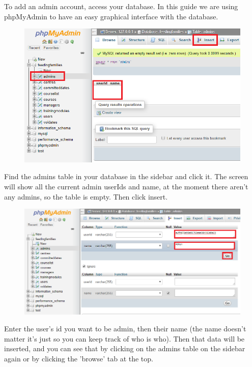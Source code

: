 \documentclass[12pt]{article}
\begin{document}
\noindent
To add an admin account, access your database. In this guide we are using phpMyAdmin to have an easy graphical interface with the database. 
\begin{figure}[H]
    \centering
    \includegraphics[width=1\textwidth]{admins/table.png}
\end{figure}
\noindent
Find the admins table in your database in the sidebar and click it. The screen will show all the current admin userIds and name, at the moment there aren't any admins, so the table is empty. Then click insert.
\begin{figure}[H]
    \centering
    \includegraphics[width=1\textwidth]{admins/insert.png}
\end{figure}
\noindent
Enter the user's id you want to be admin, then their name (the name doesn't matter it's just so you can keep track of who is who). Then that data will be inserted, and you can see that by clicking on the admins table on the sidebar again or by clicking the 'browse' tab at the top.\\
\end{document}
